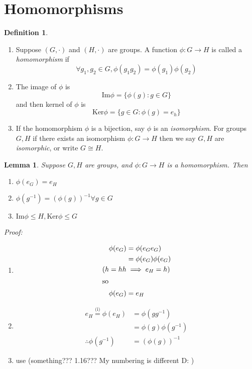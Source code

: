 \documentclass{report}
\newtheorem{lemma}[theorem]{Lemma}
\theoremstyle{remark}
\theoremstyle{definition}
\newtheorem{definition}[theorem]{Definition}
\theoremstyle{definition}
\theoremstyle{theorem}
\begin{document}
\section{Homomorphisms}
\begin{definition}
\begin{enumerate}[label=\textcircled{\tiny{\arabic*}}]
    \item Suppose $(G,\cdot)$ and $(H, \cdot)$ are groups. A function $\phi: G \rightarrow H$ is called a \emph{homomorphism} if
    \[\forall g_1, g_2 \in G, \phi(g_1g_2)=\phi(g_1)\phi(g_2)\]
    \item The image of $\phi$ is
    \[\mathrm{Im}\phi=\{\phi(g):g \in G\}\]
    and then kernel of $\phi$ is
    \[\mathrm{Ker}\phi=\{g \in G: \phi(g)=e_h\}\]
    \item If the homomorphism $\phi$ is a bijection, say $\phi$ is an \emph{isomorphism}. For groups $G,H$ if there exists an isomorphism $\phi: G \rightarrow H$ then we say $G,H$ are \emph{isomorphic}, or write $G \cong H$.
\end{enumerate}
\end{definition}
\begin{lemma}
Suppose $G,H$ are groups, and $\phi:G \rightarrow H$ is a homomorphism. Then
\begin{enumerate}[label=\roman*)]
    \item $\phi(e_G)=e_H$
    \item $\phi(g^{-1})=(\phi(g))^{-1} \forall g \in G$
    \item $\mathrm{Im}\phi \leq H, \mathrm{Ker}\phi \leq G$
\end{enumerate}
\end{lemma}
\emph{Proof:}
\begin{enumerate}[label=\roman*)]
    \item \begin{align*}
        \phi(e_G)&=\phi(e_Ge_G)\\
        &=\phi(e_G)\phi(e_G)\\
        (h=hh &\implies e_H=h)\\
        \intertext{so}
        \phi(e_G)&=e_H
    \end{align*}
    \item
    \begin{align*}
        e_H\overset{\text{(i)}}{=}\phi(e_H)&=\phi(gg^{-1})\\
        &=\phi(g)\phi(g^{-1})\\
        \therefore \phi(g^{-1})&=(\phi(g))^{-1}
    \end{align*}
    \item use (something??? 1.16??? My numbering is different D: )
\end{enumerate}
\end{document}
